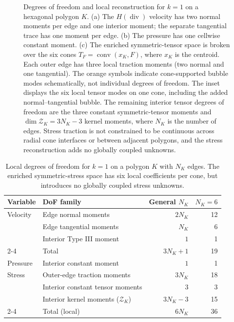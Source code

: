 \documentclass[review,hidelinks,onefignum,onetabnum]{siamart251216}
\begin{document}
\begin{figure}[t]
\caption{Degrees of freedom and local reconstruction for $k=1$ on a hexagonal polygon $K$.
(a) The $H(\operatorname{div})$ velocity has two normal moments per edge and one interior
moment; the separate tangential trace has one moment per edge.
(b) The pressure has one cellwise constant moment.
(c) The enriched symmetric-tensor space is broken over the six cones
$T_F=\operatorname{conv}(x_K,F)$, where $x_K$ is the centroid. Each outer edge
has three local traction moments (two normal and one tangential). The orange symbols
indicate cone-supported bubble modes schematically, not individual degrees of freedom.
The inset displays the six local tensor modes on one cone, including the added normal--tangential bubble. The remaining interior tensor degrees of freedom are the three constant symmetric-tensor
moments and $\dim\mathcal Z_K=3N_K-3$ kernel moments, where $N_K$ is the number of edges.
Stress traction is not constrained to be continuous across radial cone interfaces or
between adjacent polygons, and the stress reconstruction adds no globally coupled unknowns.}
\label{fig:k1-dofs}
\end{figure}

\begin{table}[t]
\centering
\caption{Local degrees of freedom for $k=1$ on a polygon $K$ with
$N_K$ edges. The enriched symmetric-stress space has six local
coefficients per cone, but introduces no globally coupled stress unknowns.}
\label{tab:k1-dof-count}
\begin{tabular}{@{}llrr@{}}
\toprule
Variable & DoF family & General $N_K$ & $N_K=6$ \\
\midrule
Velocity & Edge normal moments & $2N_K$ & 12 \\
         & Edge tangential moments & $N_K$ & 6 \\
         & Interior Type III moment & $1$ & 1 \\
\cmidrule(lr){2-4}
         & Total & $3N_K+1$ & 19 \\
\midrule
Pressure & Interior constant moment & $1$ & 1 \\
\midrule
Stress & Outer-edge traction moments & $3N_K$ & 18 \\
       & Interior constant tensor moments & $3$ & 3 \\
       & Interior kernel moments ($\mathcal Z_K$) & $3N_K-3$ & 15 \\
\cmidrule(lr){2-4}
       & Total (local) & $6N_K$ & 36 \\
\bottomrule
\end{tabular}
\end{table}
\end{document}

